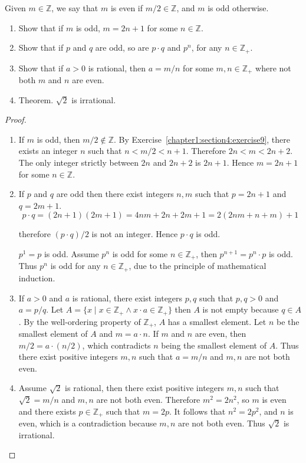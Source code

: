 \begin{exercise}\label{chapter1:section4:exercise11}
    Given $m\in\mathbb{Z}$, we say that $m$ is even if $m/2\in\mathbb{Z}$, and $m$ is odd otherwise.
    \begin{enumerate}[label={(\alph*)}]
        \item Show that if $m$ is odd, $m = 2n + 1$ for some $n\in\mathbb{Z}$.
        \item Show that if $p$ and $q$ are odd, so are $p\cdot q$ and $p^{n}$, for any $n\in\mathbb{Z}_{+}$.
        \item Show that if $a > 0$ is rational, then $a = m/n$ for some $m, n\in\mathbb{Z}_{+}$ where not both $m$ and $n$ are even.
        \item Theorem. $\sqrt{2}$ is irrational.
    \end{enumerate}
\end{exercise}

\begin{proof}
    \begin{enumerate}[label={(\alph*)}]
        \item If $m$ is odd, then $m/2\notin\mathbb{Z}$. By Exercise~\ref{chapter1:section4:exercise9}, there exists an integer $n$ such that $n < m/2 < n+1$. Therefore $2n < m < 2n + 2$. The only integer strictly between $2n$ and $2n + 2$ is $2n + 1$. Hence $m = 2n + 1$ for some $n\in\mathbb{Z}$.
        \item If $p$ and $q$ are odd then there exist integers $n, m$ such that $p = 2n + 1$ and $q = 2m + 1$.
              \[
                  p\cdot q = (2n + 1)(2m + 1) = 4nm + 2n + 2m + 1 = 2(2nm + n + m) + 1
              \]

              therefore $(p\cdot q)/2$ is not an integer. Hence $p\cdot q$ is odd.

              $p^{1} = p$ is odd. Assume $p^{n}$ is odd for some $n\in\mathbb{Z}_{+}$, then $p^{n+1} = p^{n}\cdot p$ is odd. Thus $p^{n}$ is odd for any $n\in\mathbb{Z}_{+}$, due to the principle of mathematical induction.
        \item If $a > 0$ and $a$ is rational, there exist integers $p, q$ such that $p, q > 0$ and $a = p/q$. Let $A = \{ x \mid x\in\mathbb{Z}_{+}\land x\cdot a\in\mathbb{Z}_{+} \}$ then $A$ is not empty because $q\in A$. By the well-ordering property of $\mathbb{Z}_{+}$, $A$ has a smallest element. Let $n$ be the smallest element of $A$ and $m = a\cdot n$. If $m$ and $n$ are even, then $m/2 = a\cdot (n/2)$, which contradicts $n$ being the smallest element of $A$. Thus there exist positive integers $m, n$ such that $a = m/n$ and $m, n$ are not both even.
        \item Assume $\sqrt{2}$ is rational, then there exist positive integers $m, n$ such that $\sqrt{2} = m/n$ and $m, n$ are not both even. Therefore $m^{2} = 2n^{2}$, so $m$ is even and there exists $p\in\mathbb{Z}_{+}$ such that $m = 2p$. It follows that $n^{2} = 2p^{2}$, and $n$ is even, which is a contradiction because $m, n$ are not both even. Thus $\sqrt{2}$ is irrational.
    \end{enumerate}
\end{proof}


